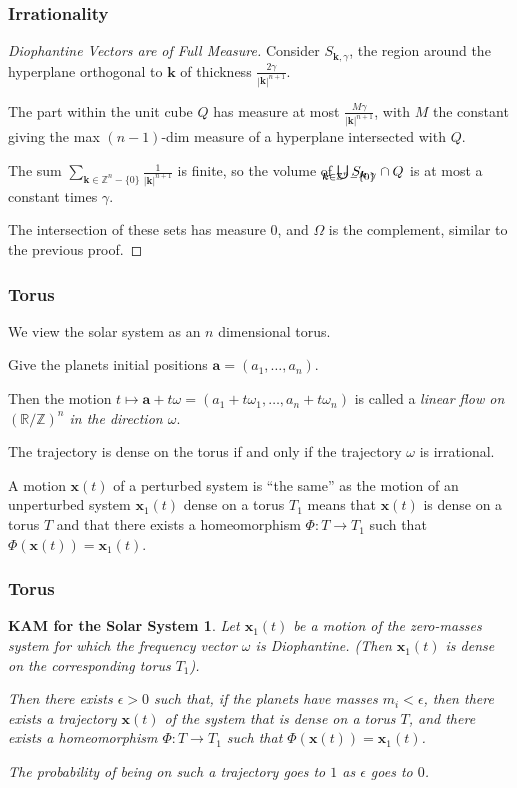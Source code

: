 \documentclass{beamer}
\newcommand{\Z}{\mathbb{Z}}
\newcommand{\R}{\mathbb{R}}
\newcommand{\bp}[1]{\bm{#1}}
\begin{document}
\begin{frame}
  \frametitle{Irrationality}
  \begin{proof}[Diophantine Vectors are of Full Measure]
    Consider $S_{\bp{k}, \gamma}$, the region around the hyperplane orthogonal
    to $\bp{k}$ of thickness $\frac{2\gamma}{|\bp{k}|^{n+1}}$.
    
    The part within the unit cube $Q$ has measure at most
    $\frac{M\gamma}{|\bp{k}|^{n+1}}$, with $M$ the constant giving the max
    $(n-1)$-dim measure of a hyperplane intersected with $Q$.

    The sum $\sum_{\bp{k} \in \Z^n - \{0\}} \frac{1}{|\bp{k}|^{n+1}}$ is finite,
    so the volume of $\bigcup_{\mathclap{\bp{k} \in \Z^n - \{0\}}} S_{\bp{k}, \gamma}
    \cap Q$ is at most a constant times $\gamma$.

    The intersection of these sets has measure $0$, and $\Omega$ is the
    complement, similar to the previous proof.
  \end{proof}
\end{frame}

\begin{frame}
  \frametitle{Torus}
  We view the solar system as an $n$ dimensional torus.

  Give the planets initial positions $\bp{a} = (a_1, \ldots, a_n)$.

  Then the motion $t \mapsto \bp{a} + t \omega = (a_1 + t \omega_1, \ldots, a_n
  + t \omega_n)$ is called a \emph{linear flow on $(\R / \Z)^n$ in the direction
    $\omega$}.

  The trajectory is dense on the torus if and only if the trajectory $\omega$ is
  irrational.

  A motion $\bp{x}(t)$ of a perturbed system is ``the same'' as the motion of an
  unperturbed system $\bp{x}_1(t)$ dense on a torus $T_1$ means that $\bp{x}(t)$
  is dense on a torus $T$ and that there exists a homeomorphism $\Phi : T \to
  T_1$ such that $\Phi(\bp{x}(t)) = \bp{x}_1(t)$.
\end{frame}

\begin{frame}
  \frametitle{Torus}
  \newtheorem{kamsolar}{KAM for the Solar System}
  \begin{kamsolar}
    Let $\bp{x}_1(t)$ be a motion of the zero-masses system for which the
    frequency vector $\omega$ is Diophantine.
    (Then $\bp{x}_1(t)$ is dense on the corresponding torus $T_1$).

    Then there exists $\epsilon > 0$ such that, if the planets have masses $m_i
    < \epsilon$, then there exists a trajectory $\bp{x}(t)$ of the system that
    is dense on a torus $T$, and there exists a homeomorphism $\Phi : T \to T_1$
    such that $\Phi(\bp{x}(t)) = \bp{x}_1(t)$.

    The probability of being on such a trajectory goes to $1$ as $\epsilon$ goes
    to $0$.
  \end{kamsolar}
\end{frame}
\end{document}
